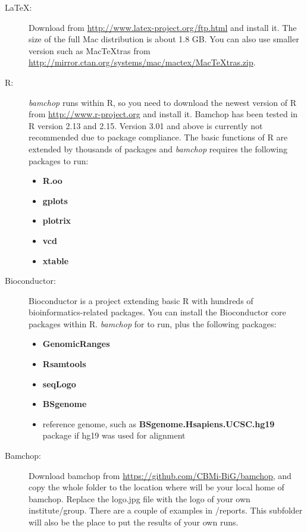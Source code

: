 \documentclass{article}
\begin{document}
\begin{description}
\item[LaTeX:] Download from \url{http://www.latex-project.org/ftp.html} and install it. The size of the full Mac distribution is about 1.8 GB. You can also use smaller version such as MacTeXtras from \url{http://mirror.ctan.org/systems/mac/mactex/MacTeXtras.zip}. 
\item[R:] \textit{bamchop} runs within R, so you need to download the newest version of R from \url{http://www.r-project.org} and install it. Bamchop has been tested in R version 2.13 and 2.15. Version 3.01 and above is currently not recommended due to package compliance. The basic functions of R are extended by thousands of packages and \textit{bamchop} requires the following packages to run:
  \begin{itemize}
  \item \textbf{R.oo}
  \item \textbf{gplots}
  \item \textbf{plotrix}
  \item \textbf{vcd}
  \item \textbf{xtable}
	\end{itemize}
\item[Bioconductor:] Bioconductor is a project extending basic R with hundreds of bioinformatics-related packages. You can install the Bioconductor core packages within R. \textit{bamchop}  for  to run, plus the following packages:
  \begin{itemize}
  \item \textbf{GenomicRanges}
  \item \textbf{Rsamtools}
  \item \textbf{seqLogo}
  \item \textbf{BSgenome}
  \item reference genome, such as \textbf{BSgenome.Hsapiens.UCSC.hg19} package if hg19 was used for alignment
  \end{itemize}
\item[Bamchop:] Download bamchop from \url{https://github.com/CBMi-BiG/bamchop}, and copy the whole folder to the location where will be your local home of bamchop. Replace the logo.jpg file with the logo of your own institute/group. There are a couple of examples in /reports. This subfolder will also be the place to put the results of your own runs.
\end{description}
\end{document}
